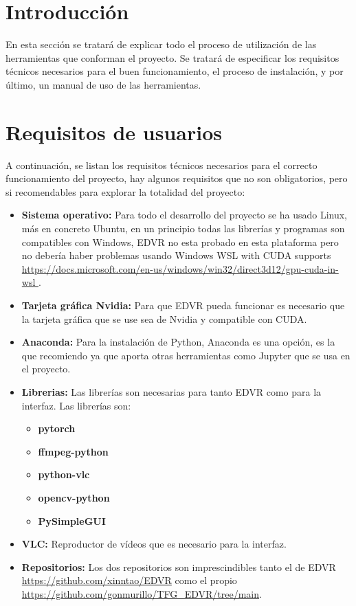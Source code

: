 

\section{Introducción}

En esta sección se tratará de explicar todo el proceso de utilización de las
herramientas que conforman el proyecto. Se tratará de especificar los requisitos
técnicos necesarios para el buen funcionamiento, el proceso de instalación, y
por último, un manual de uso de las herramientas.

\section{Requisitos de usuarios}

A continuación, se listan los requisitos técnicos necesarios para el correcto funcionamiento del proyecto, hay algunos requisitos que no son obligatorios, pero si recomendables para explorar la totalidad del proyecto:

\begin{itemize}
\item \textbf{Sistema operativo:} Para todo el desarrollo del proyecto se ha usado Linux, más en concreto Ubuntu, en un principio todas las librerías y programas son compatibles con Windows, EDVR no esta probado en esta plataforma pero no debería haber problemas usando Windows WSL with CUDA supports \url{ https://docs.microsoft.com/en-us/windows/win32/direct3d12/gpu-cuda-in-wsl }.
\item \textbf{Tarjeta gráfica Nvidia:} Para que EDVR pueda funcionar es necesario que la tarjeta gráfica que se use sea de Nvidia y compatible con CUDA.
\item \textbf{Anaconda:} Para la instalación de Python, Anaconda es una opción, es la que recomiendo ya que aporta otras herramientas como Jupyter que se usa en el proyecto.
\item\textbf{Librerias:} Las librerías son necesarias para tanto EDVR como para la interfaz. Las librerías son:
\begin{itemize}
        \item \textbf{pytorch }
		\item \textbf{ffmpeg-python}
        \item \textbf{python-vlc }
		\item \textbf{opencv-python }
		\item \textbf{PySimpleGUI}
\end{itemize}
\item\textbf{VLC:} Reproductor de vídeos que es necesario para la interfaz.
\item\textbf{Repositorios:} Los dos repositorios son imprescindibles tanto el de EDVR \url{ https://github.com/xinntao/EDVR} como el propio \url{ https://github.com/gonmurillo/TFG_EDVR/tree/main}.
\end{itemize}

